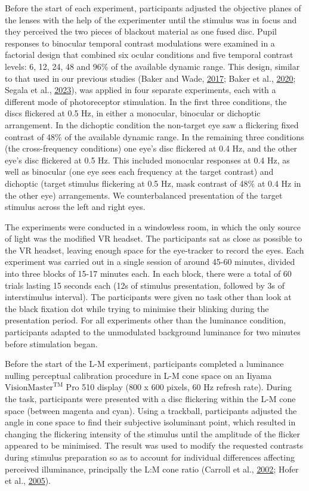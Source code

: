 \documentclass[
]{article}
\begin{document}
Before the start of each experiment, participants adjusted the objective planes of the lenses with the help of the experimenter until the stimulus was in focus and they perceived the two pieces of blackout material as one fused disc. Pupil responses to binocular temporal contrast modulations were examined in a factorial design that combined six ocular conditions and five temporal contrast levels: 6, 12, 24, 48 and 96\% of the available dynamic range. This design, similar to that used in our previous studies (Baker and Wade, \protect\hyperlink{ref-Baker2017}{2017}; Baker et al., \protect\hyperlink{ref-Baker2020}{2020}; Segala et al., \protect\hyperlink{ref-Segala2023}{2023}), was applied in four separate experiments, each with a different mode of photoreceptor stimulation. In the first three conditions, the discs flickered at 0.5 Hz, in either a monocular, binocular or dichoptic arrangement. In the dichoptic condition the non-target eye saw a flickering fixed contrast of 48\% of the available dynamic range. In the remaining three conditions (the cross-frequency conditions) one eye's disc flickered at 0.4 Hz, and the other eye's disc flickered at 0.5 Hz. This included monocular responses at 0.4 Hz, as well as binocular (one eye sees each frequency at the target contrast) and dichoptic (target stimulus flickering at 0.5 Hz, mask contrast of 48\% at 0.4 Hz in the other eye) arrangements. We counterbalanced presentation of the target stimulus across the left and right eyes.

The experiments were conducted in a windowless room, in which the only source of light was the modified VR headset. The participants sat as close as possible to the VR headset, leaving enough space for the eye-tracker to record the eyes. Each experiment was carried out in a single session of around 45-60 minutes, divided into three blocks of 15-17 minutes each. In each block, there were a total of 60 trials lasting 15 seconds each (12s of stimulus presentation, followed by 3s of interstimulus interval). The participants were given no task other than look at the black fixation dot while trying to minimise their blinking during the presentation period. For all experiments other than the luminance condition, participants adapted to the unmodulated background luminance for two minutes before stimulation began.

Before the start of the L-M experiment, participants completed a luminance nulling perceptual calibration procedure in L-M cone space on an Iiyama \(\textrm{VisionMaster}^{\textrm{TM}}\) Pro 510 display (800 x 600 pixels, 60 Hz refresh rate). During the task, participants were presented with a disc flickering within the L-M cone space (between magenta and cyan). Using a trackball, participants adjusted the angle in cone space to find their subjective isoluminant point, which resulted in changing the flickering intensity of the stimulus until the amplitude of the flicker appeared to be minimised. The result was used to modify the requested contrasts during stimulus preparation so as to account for individual differences affecting perceived illuminance, principally the L:M cone ratio (Carroll et al., \protect\hyperlink{ref-Carroll2002}{2002}; Hofer et al., \protect\hyperlink{ref-Hofer2005}{2005}).
\end{document}
